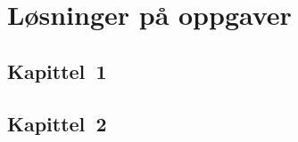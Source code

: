 
\newcommand{\kapittel}[2]{\chapter{#2}}
\newcommand{\kapittelslutt}{}



\def\inkludert{1}




\frontmatter
\tableofcontents*


\mainmatter












%
%
%
%
%
%
%
%
%
%
%
%
%
%
%
%
%
%
%
%
%
%
%
%
%
%


\backmatter

\chapter{Løsninger på oppgaver}


\section*{Kapittel~1}

\section*{Kapittel~2}

